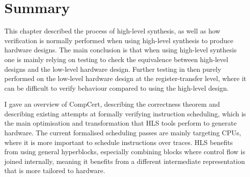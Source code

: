 %

\section{Summary}%
\label{sec:bg:summary}

This chapter described the process of high-level synthesis, as well as how
verification is normally performed when using high-level synthesis to produce
hardware designs.  The main conclusion is that when using high-level synthesis
one is mainly relying on testing to check the equivalence between high-level
designs and the low-level hardware design.  Further testing in then purely
performed on the low-level hardware design at the register-transfer level, where
it can be difficult to verify behaviour compared to using the high-level design.

I gave an overview of CompCert, describing the correctness theorem and
describing existing attempts at formally verifying instruction scheduling, which
is the main optimisation and transformation that \gls{HLS} tools perform to
generate hardware.  The current formalised scheduling passes are mainly
targeting \glspl{CPU}, where it is more important to schedule instructions over
traces.  \gls{HLS} benefits from using general hyperblocks, especially combining
blocks where control flow is joined internally, meaning it benefits from a
different intermediate representation that is more tailored to hardware.

